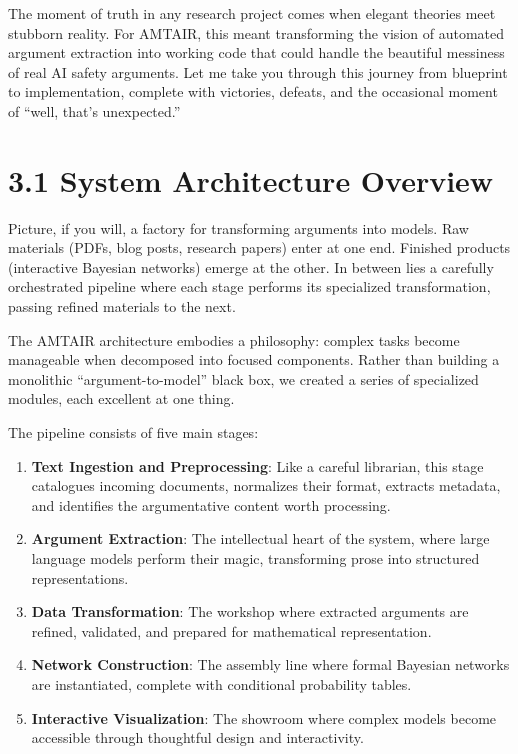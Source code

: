 \documentclass[
  11pt,
  letterpaper,
]{book}
\providecommand{\tightlist}{%
  \setlength{\itemsep}{0pt}\setlength{\parskip}{0pt}}
\begin{document}
The moment of truth in any research project comes when elegant theories
meet stubborn reality. For AMTAIR, this meant transforming the vision of
automated argument extraction into working code that could handle the
beautiful messiness of real AI safety arguments. Let me take you through
this journey from blueprint to implementation, complete with victories,
defeats, and the occasional moment of ``well, that's unexpected.''

\section{3.1 System Architecture
Overview}\label{sec-system-architecture}

Picture, if you will, a factory for transforming arguments into models.
Raw materials (PDFs, blog posts, research papers) enter at one end.
Finished products (interactive Bayesian networks) emerge at the other.
In between lies a carefully orchestrated pipeline where each stage
performs its specialized transformation, passing refined materials to
the next.

The AMTAIR architecture embodies a philosophy: complex tasks become
manageable when decomposed into focused components. Rather than building
a monolithic ``argument-to-model'' black box, we created a series of
specialized modules, each excellent at one thing.

The pipeline consists of five main stages:

\begin{enumerate}
\def\labelenumi{\arabic{enumi}.}
\tightlist
\item
  \textbf{Text Ingestion and Preprocessing}: Like a careful librarian,
  this stage catalogues incoming documents, normalizes their format,
  extracts metadata, and identifies the argumentative content worth
  processing.
\item
  \textbf{Argument Extraction}: The intellectual heart of the system,
  where large language models perform their magic, transforming prose
  into structured representations.
\item
  \textbf{Data Transformation}: The workshop where extracted arguments
  are refined, validated, and prepared for mathematical representation.
\item
  \textbf{Network Construction}: The assembly line where formal Bayesian
  networks are instantiated, complete with conditional probability
  tables.
\item
  \textbf{Interactive Visualization}: The showroom where complex models
  become accessible through thoughtful design and interactivity.
\end{enumerate}
\end{document}
